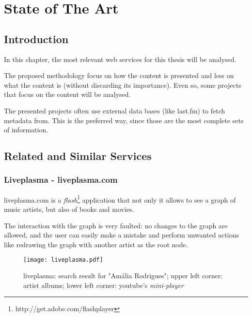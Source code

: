 
\chapter{State of The Art} \label{chap:chap2}

\section*{}

\section{Introduction}

In this chapter, the most relevant web services for this thesis will be analysed.

The proposed methodology focus on how the content is presented and less on what the content is (without discarding its importance).
Even so, some projects that focus on the content will be analysed.

The presented projects often use external data bases (like last.fm) to fetch metadata from.
This is the preferred way, since those are the most complete sets of information. 

\section{Related and Similar Services} %
\label{sec:projetos_relacionados}

\subsection{Liveplasma - liveplasma.com} %
\label{sub:liveplasma}

liveplasma.com is a \emph{flash}\footnote{http://get.adobe.com/flashplayer} application that not only it allows to see a graph of music artists, but also of books and movies.

The interaction with the graph is very faulted: no changes to the graph are allowed, and the user can easily make a mistake and perform unwanted actions like redrawing the graph with another artist as the root node.

\begin{figure}
  \begin{center}
    \texttt{[image: liveplasma.pdf]}
  \end{center}
  \caption{liveplasma: search result for "Amália Rodrigues"; upper left corner: artist albums; lower left corner: youtube's \emph{mini-player}}
  \label{fig:sota_liveplasma}
\end{figure}

